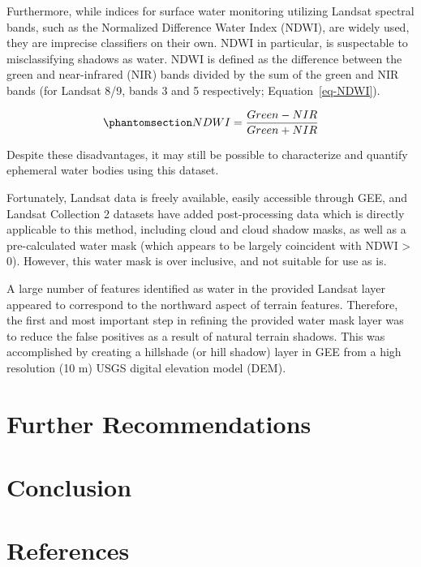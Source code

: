 \documentclass[
]{agujournal2019}
\begin{document}
Furthermore, while indices for surface water monitoring utilizing
Landsat spectral bands, such as the Normalized Difference Water Index
(NDWI), are widely used, they are imprecise classifiers on their own.
NDWI in particular, is suspectable to misclassifying shadows as water.
NDWI is defined as the difference between the green and near-infrared
(NIR) bands divided by the sum of the green and NIR bands (for Landsat
8/9, bands 3 and 5 respectively; Equation~\ref{eq-NDWI}).

\begin{equation}\phantomsection\label{eq-NDWI}{
NDWI = \frac{Green - NIR}{Green + NIR}
}\end{equation}

Despite these disadvantages, it may still be possible to characterize
and quantify ephemeral water bodies using this dataset.

Fortunately, Landsat data is freely available, easily accessible through
GEE, and Landsat Collection 2 datasets have added post-processing data
which is directly applicable to this method, including cloud and cloud
shadow masks, as well as a pre-calculated water mask (which appears to
be largely coincident with NDWI \textgreater{} 0). However, this water
mask is over inclusive, and not suitable for use as is.

A large number of features identified as water in the provided Landsat
layer appeared to correspond to the northward aspect of terrain
features. Therefore, the first and most important step in refining the
provided water mask layer was to reduce the false positives as a result
of natural terrain shadows. This was accomplished by creating a
hillshade (or hill shadow) layer in GEE from a high resolution (10 m)
USGS digital elevation model (DEM).

\section{Further Recommendations}\label{further-recommendations}

\section{Conclusion}\label{conclusion}

\section*{References}\label{references}
\end{document}
